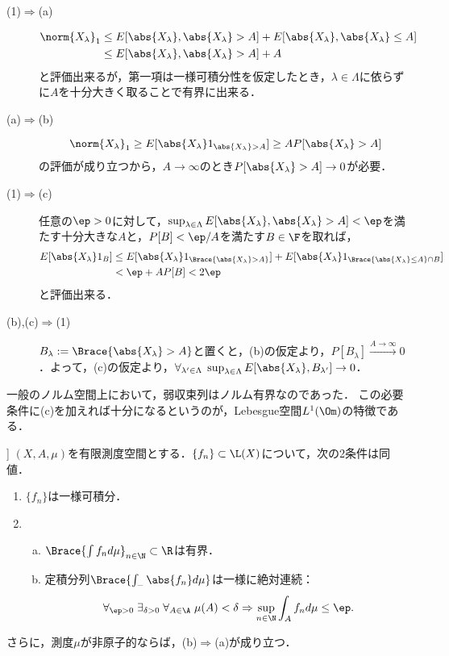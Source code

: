 \documentclass[uplatex,dvipdfmx]{jsreport}
\begin{document}
\begin{Proof}\mbox{}
    \begin{description}
        \item[(1)$\Rightarrow$(a)] \begin{align*}
            \norm{X_\lambda}_1&\le E[\abs{X_\lambda},\abs{X_\lambda}>A]+E[\abs{X_\lambda},\abs{X_\lambda}\le A]\\
            &\le E[\abs{X_\lambda},\abs{X_\lambda}>A]+A
        \end{align*}
        と評価出来るが，第一項は一様可積分性を仮定したとき，$\lambda\in\Lambda$に依らずに$A$を十分大きく取ることで有界に出来る．
        \item[(a)$\Rightarrow$(b)] 
        \[\norm{X_\lambda}_1\ge E[\abs{X_\lambda}1_{\abs{X_\lambda}>A}]\ge AP[\abs{X_\lambda}>A]\]
        の評価が成り立つから，$A\to\infty$のとき$P[\abs{X_\lambda}>A]\to0$が必要．
        \item[(1)$\Rightarrow$(c)] 任意の$\ep>0$に対して，$\sup_{\lambda\in\Lambda}E[\abs{X_\lambda},\abs{X_\lambda}>A]<\ep$を満たす十分大きな$A$と，$P[B]<\ep/A$を満たす$B\in\F$を取れば，
        \begin{align*}
            E[\abs{X_\lambda}1_B]&\le E[\abs{X_\lambda}1_{\Brace{\abs{X_\lambda}>A}}]+E[\abs{X_\lambda}1_{\Brace{\abs{X_\lambda}\le A}\cap B}]\\
            &<\ep+AP[B]<2\ep
        \end{align*}
        と評価出来る．
        \item[(b),(c)$\Rightarrow$(1)] $B_\lambda:=\Brace{\abs{X_\lambda}>A}$と置くと，(b)の仮定より，$P[B_\lambda]\xrightarrow{A\to\infty}0$．よって，(c)の仮定より，$\forall_{\lambda'\in\Lambda}\;\sup_{\lambda\in\Lambda}E[\abs{X_\lambda},B_{\lambda'}]\to0$．
    \end{description}
\end{Proof}
\begin{remarks}
    一般のノルム空間上において，弱収束列はノルム有界なのであった．
    この必要条件に(c)を加えれば十分になるというのが，Lebesgue空間$L^1(\Om)$の特徴である．
\end{remarks}

\begin{theorem}[[一般の有限測度空間上の一様可積分性の特徴付け (\cite{Billingsley76},Ex 16.9)]]
    $(X,A,\mu)$を有限測度空間とする．$\{f_n\}\subset\L(X)$について，次の2条件は同値．
    \begin{enumerate}
        \item $\{f_n\}$は一様可積分．
        \item \begin{enumerate}[(a)]
            \item $\Brace{\int f_nd\mu}_{n\in\N}\subset\R$は有界．
            \item 定積分列$\Brace{\int_-\abs{f_n}d\mu}$は一様に絶対連続：
            \[\forall_{\ep>0}\;\exists_{\delta>0}\;\forall_{A\in\A}\;\mu(A)<\delta\Rightarrow\sup_{n\in\N}\int_Af_nd\mu\le\ep.\]
        \end{enumerate}
    \end{enumerate}
    さらに，測度$\mu$が非原子的ならば，(b)$\Rightarrow$(a)が成り立つ．
\end{theorem}
\end{document}
